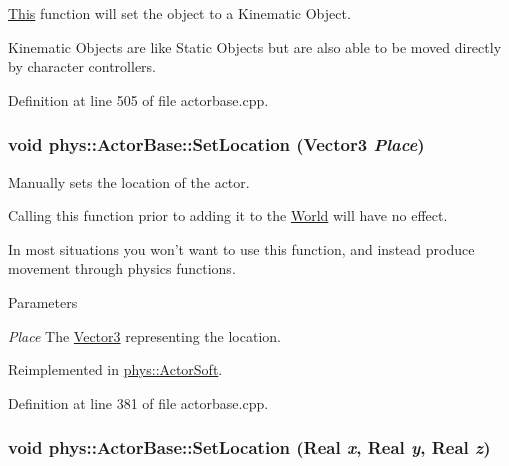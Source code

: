 \hyperlink{structThis}{This} function will set the object to a Kinematic Object. \par
 Kinematic Objects are like Static Objects but are also able to be moved directly by character controllers. 

Definition at line 505 of file actorbase.cpp.

\hypertarget{classphys_1_1ActorBase_a3212be459859a67bf7ae64919d58d5a5}{
\subsubsection[{SetLocation}]{\setlength{\rightskip}{0pt plus 5cm}void phys::ActorBase::SetLocation ({\bf Vector3} {\em Place})}}
\label{d8/d0f/classphys_1_1ActorBase_a3212be459859a67bf7ae64919d58d5a5}


Manually sets the location of the actor. 

Calling this function prior to adding it to the \hyperlink{classphys_1_1World}{World} will have no effect. \par
 In most situations you won't want to use this function, and instead produce movement through physics functions. 
\begin{DoxyParams}{Parameters}
\item[{\em Place}]The \hyperlink{classphys_1_1Vector3}{Vector3} representing the location. \end{DoxyParams}


Reimplemented in \hyperlink{classphys_1_1ActorSoft_a35020af183a31e288ff226a34fd1a0ab}{phys::ActorSoft}.



Definition at line 381 of file actorbase.cpp.

\hypertarget{classphys_1_1ActorBase_a0b0db2ec0f4926326635b86f1ead2276}{
\subsubsection[{SetLocation}]{\setlength{\rightskip}{0pt plus 5cm}void phys::ActorBase::SetLocation ({\bf Real} {\em x}, \/  {\bf Real} {\em y}, \/  {\bf Real} {\em z})}}
\label{d8/d0f/classphys_1_1ActorBase_a0b0db2ec0f4926326635b86f1ead2276}


